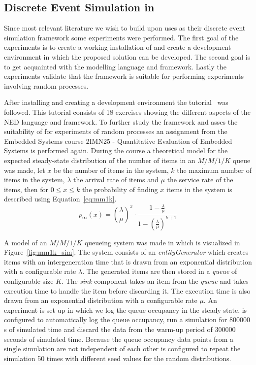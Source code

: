 \subsection{Discrete Event Simulation in \omnet}
\label{sec:omnetpp}
Since most relevant literature we wish to build upon uses \omnet as their discrete event simulation framework some experiments were performed. The first goal of the experiments is to create a working installation of \omnet and create a development environment in which the proposed solution can be developed. The second goal is to get acquainted with the modelling language and framework. Lastly the experiments validate that the framework is suitable for performing experiments involving random processes.

After installing \omnet and creating a development environment the \omnet tutorial~\cite{omnettutorial} was followed. This tutorial consists of 18 exercises showing the different aspects of the NED language and framework. To further study the framework and asses the suitability of \omnet for experiments of random processes an assignment from the Embedded Systems course 2IMN25 - Quantitative Evaluation of Embedded Systems is performed again. During the course a theoretical model for the expected steady-state distribution of the number of items in an $M/M/1/K$ queue was made, let $x$ be the number of items in the system, $k$ the maximum number of items in the system, $\lambda$ the arrival rate of items and $\mu$ the service rate of the items, then for $0 \leq x\leq k$ the probability of finding $x$ items in the system is described using Equation~\ref{eq:mm1k}. 
\begin{equation}
    \label{eq:mm1k}
p_\infty (x) = \left(\frac{\lambda}{\mu}\right)^x\cdot\frac{1-\frac{\lambda}{\mu}}{1-\left(\frac{\lambda}{\mu}\right)^{k+1}}
\end{equation}

A model of an $M/M/1/K$ queueing system was made in \omnet which is visualized in Figure~\ref{fig:mm1k_sim}. The system consists of an \textit{entityGenerator} which creates items with an intergeneration time that is drawn from an exponential distribution with a configurable rate $\lambda$. The generated items are then stored in a \textit{queue} of configurable size $K$. The \textit{sink} component takes an item from the \textit{queue} and takes execution time to handle the item before discarding it. The execution time is also drawn from an exponential distribution with a configurable rate $\mu$. An experiment is set up in which we log the queue occupancy in the steady state, \omnet is configured to automatically log the queue occupancy, run a simulation for 800000 s of simulated time and discard the data from the warm-up period of 300000 seconds of simulated time. Because the queue occupancy data points from a single simulation are not independent of each other \omnet is configured to repeat the simulation 50 times with different seed values for the random distributions.

